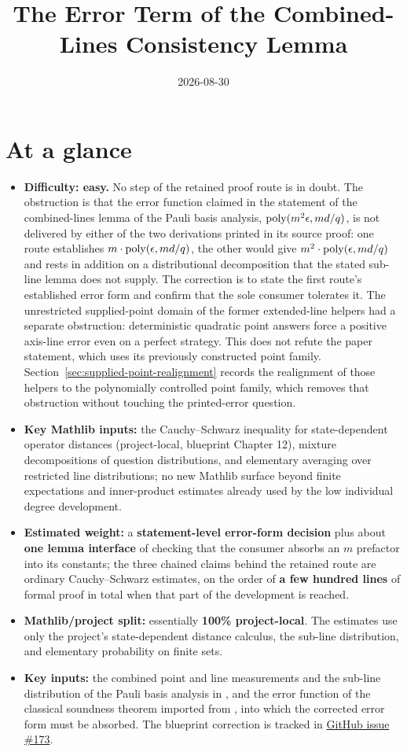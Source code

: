 \documentclass[11pt]{article}
\title{The Error Term of the Combined-Lines Consistency Lemma}
\author{}
\date{2026-08-30}
\DeclareMathOperator{\poly}{poly}
\renewcommand{\ghissue}[1]{%
  \href{https://github.com/Dengnifer/MIPStarRE-QPBT/issues/#1}{GitHub issue \##1}}
\begin{document}
\maketitle

\section{At a glance}

\begin{itemize}
  \item \textbf{Difficulty: easy.}  No step of the retained proof route is
  in doubt.  The obstruction is that the error function claimed in the
  statement of the combined-lines lemma of the Pauli basis analysis,
  $\poly(m^2\eps, md/q)$, is not delivered by either of the two
  derivations printed in its source proof: one route establishes
  $m \cdot \poly(\eps, md/q)$, the other would give
  $m^2 \cdot \poly(\eps, md/q)$ and rests in addition on a distributional
  decomposition that the stated sub-line lemma does not supply.  The
  correction is to state the first route's established error form and confirm
  that the sole consumer tolerates it.
  The unrestricted supplied-point domain of the former extended-line helpers
  had a separate obstruction: deterministic quadratic point answers force a
  positive axis-line error even on a perfect strategy. This does not refute
  the paper statement, which uses its previously constructed point family.
  Section~\ref{sec:supplied-point-realignment} records the realignment of
  those helpers to the polynomially controlled point family, which removes
  that obstruction without touching the printed-error question.
  \item \textbf{Key Mathlib inputs:} the
  Cauchy--Schwarz inequality for state-dependent operator distances
  (project-local, blueprint Chapter 12), mixture decompositions of
  question distributions, and elementary averaging over restricted
  line distributions; no new Mathlib surface beyond finite
  expectations and inner-product estimates already used by the
  low individual degree development.
  \item \textbf{Estimated weight:} a \textbf{statement-level error-form
  decision} plus about \textbf{one lemma interface} of checking that the
  consumer absorbs an $m$ prefactor into its constants; the three chained
  claims behind the retained route are ordinary Cauchy--Schwarz estimates,
  on the order of \textbf{a few hundred lines} of formal proof in total
  when that part of the development is reached.
  \item \textbf{Mathlib/project split:} essentially \textbf{100\%
  project-local}.  The estimates use only the project's state-dependent
  distance calculus, the sub-line distribution, and elementary
  probability on finite sets.
  \item \textbf{Key inputs:} the combined point and line measurements and
  the sub-line distribution of the Pauli basis analysis in
  \cite{Ji2020MIPStar}, and the error function of the classical soundness
  theorem imported from \cite{Ji2020LowIndividualDegree}, into which the
  corrected error form must be absorbed.  The blueprint correction is tracked
  in \ghissue{173}.
\end{itemize}
\end{document}
